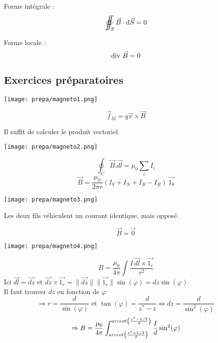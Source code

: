 \documentclass[british,french,11pt, a4paper, openany]{book}
\begin{document}
		
		Forme intégrale : $$ \int\!\!\!\!\!\!\!\subset\!\!\!\supset\!\!\!\!\!\!\!\int_{S} \vec B \cdot {\rm d} \vec S = 0$$
		
		Forme locale : $$ \text{div}\,\,\vec B = 0$$
		
		
		
		
		
		
		\subsection{Exercices préparatoires}
		\begin{center}
			\texttt{[image: prepa/magneto1.png]}\\
		\end{center}
		$$\vec{f}_M = q\vec{v} \times \vec{B}$$
		\begin{center}
			Il suffit de calculer le produit vectoriel.
		\end{center}
		
		
		\begin{center}
			\texttt{[image: prepa/magneto2.png]}\\
		\end{center}
		
		$$\oint_C \vec{B}.\vec{dl} = \mu_0 \sum_i I_i$$
		$$\vec{B} = \frac{\mu_0}{2\pi r}\left(I_V + I_N + I_B - I_R\right)\ \vec{1_\theta}$$
		
		
		
		
		\newpage
		\begin{center}
			\texttt{[image: prepa/magneto3.png]}\\
		\end{center}
		\begin{center}
			Les deux fils véhiculent un courant identique, mais opposé.
		\end{center}
		$$\vec{B} = \vec{0}$$
		
		\begin{center}
			\texttt{[image: prepa/magneto4.png]}\\
		\end{center}
		$$B=\frac{\mu_0}{4\pi}\int \frac{I\,\vec{dl}\times\vec{1_r}}{r^2}$$Ici $\vec{dl}=\vec{dz}$ et $\vec{dz}\times\vec{1_r}=\|\vec{dz}\| \|\vec{1_r}\|\sin(\varphi)=dz\sin(\varphi)$\\
		Il faut trouver $dz$ en fonction de $\varphi$  $$\Rightarrow r=\frac{d}{\sin(\varphi)}\text{ et } \tan(\varphi)=\frac{d}{z^*-z}\Leftrightarrow dz=\frac{d}{\sin^2(\varphi)}$$
		$$\Rightarrow B = \frac{\mu_0}{4\pi}\int_{arccot\left(\frac{z^*+L/2}{d}\right)}^{arccot\left(\frac{z^*-L/2}{d}\right)}\frac{I}{d}\sin^2(\varphi)$$
				
\end{document}
